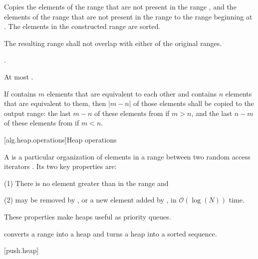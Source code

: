\begin{itemdescr}
\pnum
\effects
Copies the elements of the range
that are not present in the range
,
and the elements of the range
that are not present in the range
to the range beginning at
.
The elements in the constructed range are sorted.

\pnum
\requires
The resulting range shall not overlap with either of the original ranges.

\pnum
\returns
{}
.

\pnum
\complexity
At most
.

\pnum
\notes
If  contains $m$ elements that are equivalent to each other and
 contains $n$ elements that are equivalent to them, then
$|m - n|$ of those elements shall be copied to the output range: the last
$m - n$ of these elements from  if $m > n$, and the last
$n - m$ of these elements from  if $m < n$.
\end{itemdescr}

[alg.heap.operations]{Heap operations}

\pnum
A
is a particular organization of elements in a range between two random access iterators
.
Its two key properties are:

\begin{description}
\item{(1)} There is no element greater than
in the range and
\item{(2)} 
may be removed by
,
or a new element added by
,
in
$\mathcal{O}(\log(N))$
time.
\end{description}

\pnum
These properties make heaps useful as priority queues.

\pnum
{}
converts a range into a heap and
turns a heap into a sorted sequence.

[push.heap]{}


